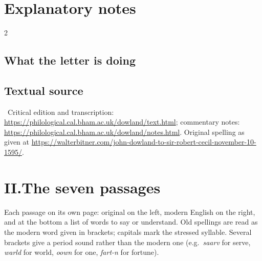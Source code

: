 \documentclass[11pt,a4paper]{article}
\newcommand{\ptitle}[1]{\ifcase#1\or
  O Sweet Woods, the Delight of Solitariness\or
  Fine Knacks for Ladies\or
  Clear or Cloudy, Sweet as April Showering\or
  Lasso vita mia, mi fa morire\or
  Come Again, Sweet Love doth Now Invite\or
  In Darkness Let Me Dwell\or
  Weep You No More, Sad Fountains\fi}
\newcommand{\colhead}[1]{{\small\scshape\color{black!60}#1}\par\vspace{-0.2em}}
\begin{document}
\section*{Explanatory notes}
{\small
\begin{multicols}{2}
\setlength{\parskip}{0.35em}

\end{multicols}

\subsection*{What the letter is doing}
\DoingText

\subsection*{Textual source}
\SourceText\ Critical edition and transcription:
\url{https://philological.cal.bham.ac.uk/dowland/text.html}; commentary notes:
\url{https://philological.cal.bham.ac.uk/dowland/notes.html}. Original
spelling as given at
\url{https://walterbitner.com/john-dowland-to-sir-robert-cecil-november-10-1595/}.
\par}

\newcommand{\passagepage}[4]{%
  \begin{paracol}{2}
  \colhead{Original (1595)}
  #2
  \switchcolumn
  \colhead{Modern English}
  #3
  \end{paracol}
  \par\vspace{0.4em}
  \noindent{\Large\colorbox{tag#1}{\color{white}\bfseries\,#1\,}\enspace
    \color{tag#1}\ptitle{#1}}\par\vspace{0.1em}
  \noindent{\color{tag#1}\rule{\linewidth}{1.2pt}}\par
  \vfill
  \noindent{\color{tag#1}\rule{\linewidth}{0.6pt}}\par
  {\small\colhead{Pronunciation and meanings}
  \begin{multicols}{2}
  \setlength{\parskip}{0.15em}\raggedright
  #4
  \end{multicols}}
}

\clearpage
\section*{II.\enspace The seven passages}
Each passage on its own page: original on the left, modern English on the
right, and at the bottom a list of words to say or understand. Old spellings
are read as the modern word given in brackets; capitals mark the stressed
syllable. Several brackets give a period sound rather than the modern
one (e.g.\ \emph{saarv} for serve, \emph{warld} for world, \emph{oown} for
one, \emph{fart-n} for fortune).
\end{document}

